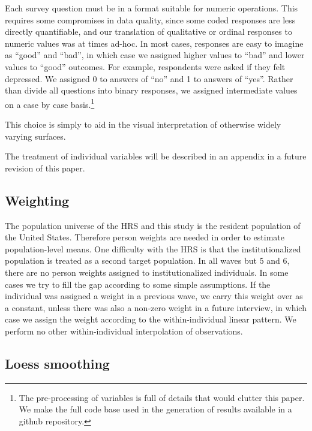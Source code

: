 \documentclass{article}
\begin{document}
Each survey question must be in a format suitable for numeric operations.
This requires some compromises in data quality, since some coded responses are less directly
quantifiable, and our translation of qualitative or ordinal responses to numeric
values was at times ad-hoc. In most cases, responses are easy to imagine as
``good'' and ``bad'', in which case we assigned higher values to ``bad'' and
lower values to ``good'' outcomes. For example, respondents were asked if they
felt depressed. We assigned 0 to answers of ``no'' and 1 to answers of ``yes''.
Rather than divide all questions into binary responses, we assigned intermediate
values on a case by case basis.\footnote{The pre-processing of variables is
full of details that would clutter this paper. We make the full code base used
in the generation of results available in a github repository.}

 This choice is simply to
aid in the visual interpretation of otherwise widely varying surfaces.

The treatment of individual variables will be
described in an appendix in a future revision of this paper.

\subsection*{Weighting}
The population universe of the HRS and this study is the resident
population of the United States. Therefore person weights are needed in
order to estimate population-level means. 
One difficulty with the HRS is that the institutionalized population is treated
as a second target population. In all waves but 5 and 6, there are no person weights
assigned to institutionalized individuals. In some cases we try to fill the gap according to some simple
assumptions. If the individual was assigned a weight in a previous wave, we
carry this weight over as a constant, unless there was also a non-zero weight in a future interview, in
which case we assign the weight according to the within-individual linear
pattern. We perform no other within-individual interpolation of observations.

\subsection*{Loess smoothing}
\end{document}

